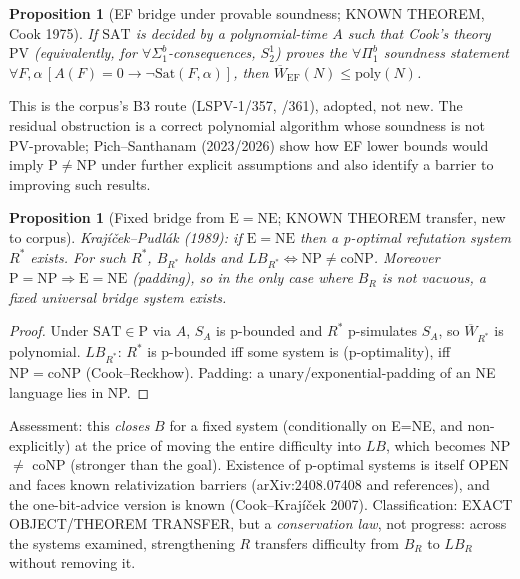 \documentclass[11pt]{article}
\newtheorem{proposition}[theorem]{Proposition}
\newcommand{\SAT}{\mathrm{SAT}}
\newcommand{\poly}{\mathrm{poly}}
\newcommand{\Wb}{\overline W}
\begin{document}
\begin{proposition}[EF bridge under provable soundness; KNOWN THEOREM, Cook 1975]\label{prop:pv}
If $\SAT$ is decided by a polynomial-time $A$ such that Cook's theory $\mathrm{PV}$ (equivalently, for
$\forall\Sigma^b_1$-consequences, $S^1_2$) proves the $\forall\Pi^b_1$ soundness statement
$\forall F,\alpha\,[A(F)=0\to \neg\mathrm{Sat}(F,\alpha)]$, then $\Wb_{\mathrm{EF}}(N)\le\poly(N)$.
\end{proposition}
This is the corpus's B3 route (LSPV-1/357, /361), adopted, not new. The residual obstruction is a
correct polynomial algorithm whose soundness is not PV-provable; Pich--Santhanam (2023/2026) show
how EF lower bounds would imply $\mathrm P\ne\mathrm{NP}$ under further explicit assumptions and also
identify a barrier to improving such results.

\begin{proposition}[Fixed bridge from $\mathrm E=\mathrm{NE}$; KNOWN THEOREM transfer, new to corpus]\label{prop:kp}
Kraj\'i\v{c}ek--Pudl\'ak (1989): if $\mathrm E=\mathrm{NE}$ then a p-optimal refutation system $R^\ast$ exists.
For such $R^\ast$, $B_{R^\ast}$ holds and $LB_{R^\ast}\iff\mathrm{NP}\ne\mathrm{coNP}$. Moreover
$\mathrm P=\mathrm{NP}\Rightarrow\mathrm E=\mathrm{NE}$ (padding), so in the only case where $B_R$ is not
vacuous, a fixed universal bridge system exists.
\end{proposition}
\begin{proof}
Under $\SAT\in\mathrm P$ via $A$, $S_A$ is p-bounded and $R^\ast$ p-simulates $S_A$, so $\Wb_{R^\ast}$ is
polynomial. $LB_{R^\ast}$: $R^\ast$ is p-bounded iff some system is (p-optimality), iff $\mathrm{NP}=\mathrm{coNP}$
(Cook--Reckhow). Padding: a unary/exponential-padding of an NE language lies in NP.
\end{proof}
Assessment: this \emph{closes} $B$ for a fixed system (conditionally on E=NE, and non-explicitly) at the
price of moving the entire difficulty into $LB$, which becomes NP $\neq$ coNP (stronger than the goal).
Existence of p-optimal systems is itself OPEN and faces known relativization barriers (arXiv:2408.07408 and references), and the one-bit-advice version is known (Cook--Kraj\'i\v{c}ek 2007). Classification: EXACT
OBJECT/THEOREM TRANSFER, but a \emph{conservation law}, not progress: across the systems examined, strengthening
$R$ transfers difficulty from $B_R$ to $LB_R$ without removing it.
\end{document}
